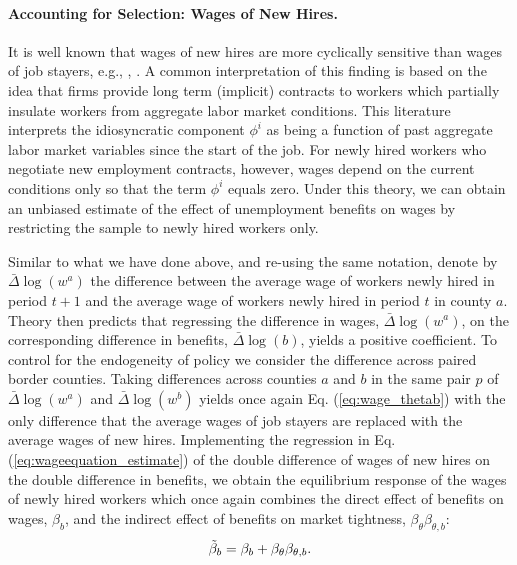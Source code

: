 \documentclass[12pt]{article}
\newcommand{\1}{\mathbf{1}}
\newcommand{\beq}{\begin{eqnarray}}
\newcommand{\eeq}{\end{eqnarray}}
\begin{document}
\begin{appendix}
\paragraph{Accounting for Selection: Wages of New Hires.}
It is well known that wages of new hires are more cyclically sensitive than wages of job stayers, e.g., \citet{haefke+sonntag+vanrens:12}, \citet{pissarides:09}. A common interpretation of this finding is based on the idea that firms provide long term (implicit) contracts to workers which partially insulate workers from aggregate labor market conditions. This literature interprets the idiosyncratic component $\phi^i$ as being a function of past aggregate labor market variables since the start of the job. For newly hired workers who negotiate new employment contracts, however, wages depend on the current conditions only so that the term $\phi^i$ equals zero. Under this theory, we can obtain an unbiased estimate of the effect of unemployment benefits on wages by restricting the sample to newly hired workers only.

Similar to what we have done above, and re-using the same notation, denote by $\bar{\Delta} \log(w^a)$ the difference between the average wage of workers newly hired in period $t+1$ and the average wage of workers newly hired in period $t$ in county $a$. Theory then predicts that regressing the difference in wages, $\bar{\Delta} \log(w^a)$, on the corresponding difference in benefits, $\bar{\Delta} \log(b)$, yields a positive coefficient. To control for the endogeneity of policy we consider the difference across paired border counties. Taking differences across counties $a$ and $b$ in the same pair $p$ of $\bar{\Delta}\log(w^a)$ and $\bar{\Delta}\log(w^b)$ yields once again Eq. (\ref{eq:wage_thetab}) with the only difference that the average wages of job stayers are replaced with the average wages of new hires. Implementing the regression in Eq. (\ref{eq:wageequation_estimate}) of the double difference of wages of new hires on the double difference in benefits, we obtain the equilibrium response of the wages of newly hired workers which once again combines the direct effect of benefits on wages, $\beta_b$, and the indirect effect of benefits on market tightness, $\beta_{\theta} \beta_{\theta,b}$:
\beq
\tilde{\beta}_b = \beta_b + \beta_{\theta} \beta_{\theta,b}. \notag
\eeq


\end{appendix}
\end{document}
